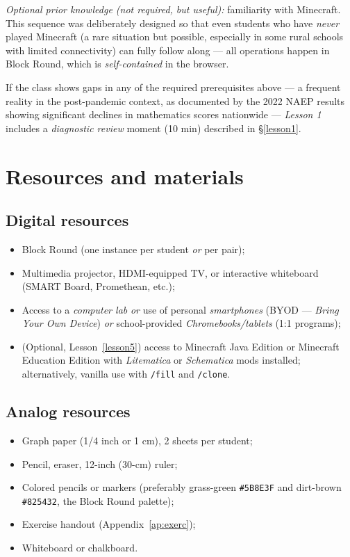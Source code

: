 \documentclass[12pt,a4paper]{scrartcl}
\newcommand{\cmd}[1]{\textcolor{earth}{\texttt{\small #1}}}
\begin{document}
\emph{Optional prior knowledge (not required, but useful):} familiarity with Minecraft. This sequence was deliberately designed so that even students who have \emph{never} played Minecraft (a rare situation but possible, especially in some rural schools with limited connectivity) can fully follow along --- all operations happen in Block Round, which is \emph{self-contained} in the browser.

If the class shows gaps in any of the required prerequisites above --- a frequent reality in the post-pandemic context, as documented by the 2022 NAEP results showing significant declines in mathematics scores nationwide --- \emph{Lesson 1} includes a \emph{diagnostic review} moment (10 min) described in §\ref{lesson1}.

\section{Resources and materials}\label{sec:resources}

\subsection{Digital resources}
\begin{itemize}[leftmargin=1.3em,itemsep=0.15em,topsep=0.3em]
  \item Block Round (one instance per student \emph{or} per pair);
  \item Multimedia projector, HDMI-equipped TV, or interactive whiteboard (SMART Board, Promethean, etc.);
  \item Access to a \emph{computer lab} \emph{or} use of personal \emph{smartphones} (BYOD --- \emph{Bring Your Own Device}) \emph{or} school-provided \emph{Chromebooks/tablets} (1:1 programs);
  \item (Optional, Lesson~\ref{lesson5}) access to Minecraft Java Edition or Minecraft Education Edition with \emph{Litematica} or \emph{Schematica} mods installed; alternatively, vanilla use with \cmd{/fill} and \cmd{/clone}.
\end{itemize}

\subsection{Analog resources}
\begin{itemize}[leftmargin=1.3em,itemsep=0.15em,topsep=0.3em]
  \item Graph paper (1/4 inch or 1 cm), 2 sheets per student;
  \item Pencil, eraser, 12-inch (30-cm) ruler;
  \item Colored pencils or markers (preferably grass-green \texttt{\#5B8E3F} and dirt-brown \texttt{\#825432}, the Block Round palette);
  \item Exercise handout (Appendix~\ref{ap:exerc});
  \item Whiteboard or chalkboard.
\end{itemize}
\end{document}
